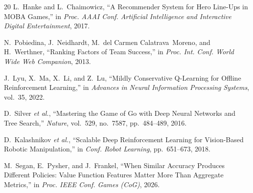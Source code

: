\documentclass[journal]{IEEEtran}
\begin{document}
\begin{thebibliography}{20}
L.~Hanke and L.~Chaimowicz, ``A Recommender System for Hero Line-Ups in MOBA Games,'' in \textit{Proc. AAAI Conf. Artificial Intelligence and Interactive Digital Entertainment}, 2017.

N.~Pobiedina, J.~Neidhardt, M.~del Carmen Calatrava~Moreno, and H.~Werthner, ``Ranking Factors of Team Success,'' in \textit{Proc. Int. Conf. World Wide Web Companion}, 2013.

J.~Lyu, X.~Ma, X.~Li, and Z.~Lu, ``Mildly Conservative Q-Learning for Offline Reinforcement Learning,'' in \textit{Advances in Neural Information Processing Systems}, vol.~35, 2022.

D.~Silver \textit{et al.}, ``Mastering the Game of Go with Deep Neural Networks and Tree Search,'' \textit{Nature}, vol.~529, no.~7587, pp.~484--489, 2016.

D.~Kalashnikov \textit{et al.}, ``Scalable Deep Reinforcement Learning for Vision-Based Robotic Manipulation,'' in \textit{Conf. Robot Learning}, pp.~651--673, 2018.

M.~Segan, E.~Pysher, and J.~Frankel, ``When Similar Accuracy Produces Different Policies: Value Function Features Matter More Than Aggregate Metrics,'' in \textit{Proc. IEEE Conf. Games (CoG)}, 2026.

\end{thebibliography}
\end{document}
